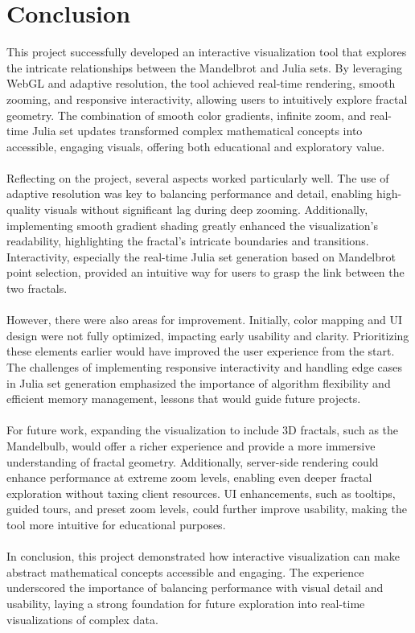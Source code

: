 \documentclass[12pt,a4paper]{report}
\begin{document}
\section{Conclusion}
This project successfully developed an interactive visualization tool that explores the intricate relationships between the Mandelbrot and Julia sets. By leveraging WebGL and adaptive resolution, the tool achieved real-time rendering, smooth zooming, and responsive interactivity, allowing users to intuitively explore fractal geometry. The combination of smooth color gradients, infinite zoom, and real-time Julia set updates transformed complex mathematical concepts into accessible, engaging visuals, offering both educational and exploratory value. 
\\\\
Reflecting on the project, several aspects worked particularly well. The use of adaptive resolution was key to balancing performance and detail, enabling high-quality visuals without significant lag during deep zooming. Additionally, implementing smooth gradient shading greatly enhanced the visualization's readability, highlighting the fractal’s intricate boundaries and transitions. Interactivity, especially the real-time Julia set generation based on Mandelbrot point selection, provided an intuitive way for users to grasp the link between the two fractals. 
\\\\
However, there were also areas for improvement. Initially, color mapping and UI design were not fully optimized, impacting early usability and clarity. Prioritizing these elements earlier would have improved the user experience from the start. The challenges of implementing responsive interactivity and handling edge cases in Julia set generation emphasized the importance of algorithm flexibility and efficient memory management, lessons that would guide future projects. 
\\\\
For future work, expanding the visualization to include 3D fractals, such as the Mandelbulb, would offer a richer experience and provide a more immersive understanding of fractal geometry. Additionally, server-side rendering could enhance performance at extreme zoom levels, enabling even deeper fractal exploration without taxing client resources. UI enhancements, such as tooltips, guided tours, and preset zoom levels, could further improve usability, making the tool more intuitive for educational purposes. 
\\\\
In conclusion, this project demonstrated how interactive visualization can make abstract mathematical concepts accessible and engaging. The experience underscored the importance of balancing performance with visual detail and usability, laying a strong foundation for future exploration into real-time visualizations of complex data. 
\end{document}
